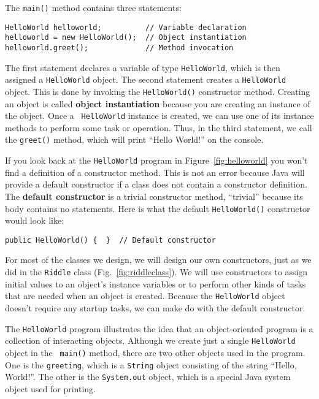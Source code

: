 The {\tt main()} method contains three statements:

\begin{jjjlisting}
\begin{lstlisting}
HelloWorld helloworld;          // Variable declaration
helloworld = new HelloWorld();  // Object instantiation
helloworld.greet();             // Method invocation
\end{lstlisting}
\end{jjjlisting}

\noindent The first statement declares a variable of type 
{\tt HelloWorld}, which is then assigned a {\tt HelloWorld} object. 
The second statement creates a {\tt HelloWorld}
object. This is done by invoking the {\tt HelloWorld()} constructor
method. Creating an object is called {\bf object instantiation}
because you are creating an instance of the object.  Once a {\tt
HelloWorld} instance is created, we can use one of its instance
methods to perform some task or operation. Thus, in the third
statement, we call the {\tt greet()} method, which will print ``Hello
World!'' on the console.

If you look back at the {\tt HelloWorld} program in
Figure~\ref{fig:helloworld} you won't find a definition of a
constructor method.  This is not an error because Java will provide a
default constructor if a class does not contain a constructor
definition. The {\bf default constructor} is a trivial constructor
method, ``trivial'' because its body contains no statements. Here
is what the default {\tt HelloWorld()} constructor would look like:

\begin{jjjlisting}
\begin{lstlisting}
public HelloWorld() {  }  // Default constructor
\end{lstlisting}
\end{jjjlisting}

\noindent For most of the classes we design, we will design our
own constructors, just as we did in the {\tt Riddle} class
(Fig.~\ref{fig:riddleclass}).  We will use constructors to assign
initial values to an object's instance variables or to perform other
kinds of tasks that are needed when an object is created. Because the
{\tt HelloWorld} object doesn't require any startup tasks, we can make
do with the default constructor.

The {\tt HelloWorld} program illustrates the idea that an
object-oriented program is a collection of interacting objects.
Although we create just a single {\tt HelloWorld} object in the {\tt
main()} method, there are two other objects used in the program. One
is the {\tt greeting}, which is a {\tt String} object consisting of
the string ``Hello, World!''.  The other is the {\tt System.out}
object, which is a special Java system object used for printing.
	
